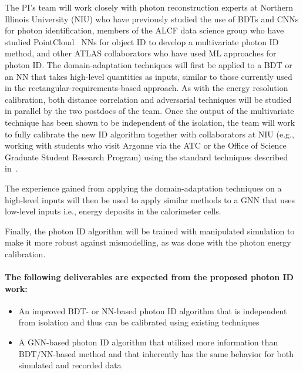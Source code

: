 \documentclass[letter, USenglish, 11pt, subfigure]{article}
\begin{document}
The PI's team will work closely with photon reconstruction experts at Northern Illinois University (NIU) who have previously studied the use of BDTs and CNNs for photon identification, members of the ALCF data science group who have studied PointCloud~\cite{ATL-PHYS-PUB-2021-002} NNs for object ID to develop a multivariate photon ID method, and other ATLAS collaborators who have used ML approaches for photon ID. The domain-adaptation techniques will first be applied to a BDT or an NN that takes high-level quantities as inputs, similar to those currently used in the rectangular-requirements-based approach. As with the energy resolution calibration, both distance correlation and adversarial techniques will be studied in parallel by the two postdocs of the team. Once the output of the multivariate technique has been shown to be independent of the isolation, the team will work to fully calibrate the new ID algorithm together with collaborators at NIU (e.g., working with students who visit Argonne via the ATC or the Office of Science Graduate Student Research Program) using the standard techniques described in~\cite{PERF-2013-04,PERF-2017-02}.

The experience gained from applying the domain-adaptation techniques on a high-level inputs will then be used to apply similar methods to a GNN that uses low-level inputs i.e., energy deposits in the calorimeter cells.

Finally, the photon ID algorithm will be trained with manipulated simulation to make it more robust against mismodelling, as was done with the photon energy calibration. 

\paragraph{The following deliverables are expected from the proposed photon ID work:}
\begin{itemize}
\item An improved BDT- or NN-based photon ID algorithm that is independent from isolation and thus can be calibrated using existing techniques
\item A GNN-based photon ID algorithm that utilized more information than BDT/NN-based method and that inherently has the same behavior for both simulated and recorded data
\end{itemize}
\end{document}
